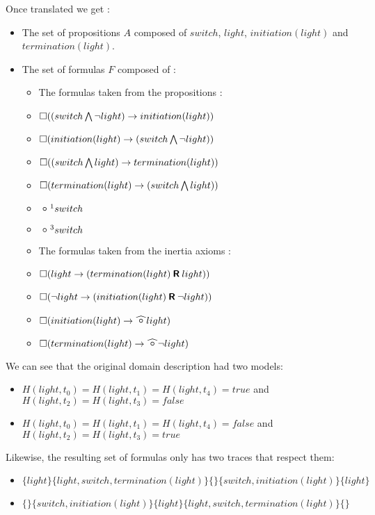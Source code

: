 Once translated we get :
\begin{itemize}
  \item The set of propositions $A$ composed of $switch$, $light$, $initiation(light)$ and $termination(light)$.
  \item The set of formulas $F$ composed of :
  \begin{itemize}
    \item The formulas taken from the propositions :
    \item $\square((switch\bigwedge \neg light)\rightarrow initiation(light))$
    \item $\square(initiation(light)\rightarrow (switch\bigwedge \neg light))$
    \item $\square((switch\bigwedge light)\rightarrow termination(light))$
    \item $\square(termination(light)\rightarrow (switch\bigwedge light))$
    \item $\next^{1}switch$
    \item $\next^{3}switch$
    \item The formulas taken from the inertia axioms :
    \item $\square(light\rightarrow (termination(light) \mathbin{\bm{\mathsf{R}}} light))$
    \item $\square(\neg light\rightarrow (initiation(light) \mathbin{\bm{\mathsf{R}}} \neg light))$
    \item $\alwaysF(initiation(light)\rightarrow\wnext light)$
    \item $\alwaysF(termination(light)\rightarrow\wnext \neg light)$
  \end{itemize}
\end{itemize}

We can see that the original domain description had two models:
\begin{itemize}
  \item $H(light,t_0)=H(light,t_1)=H(light,t_4)=true$ and $H(light,t_2)=H(light,t_3)=false$
  \item $H(light,t_0)=H(light,t_1)=H(light,t_4)=false$ and $H(light,t_2)=H(light,t_3)=true$
\end{itemize}

Likewise, the resulting set of formulas only has two traces that respect them:
\begin{itemize}
  \item $\{light\}\{light,switch,termination(light)\}\{\}\{switch,initiation(light)\}\{light\}$
  \item $\{\}\{switch,initiation(light)\}\{light\}\{light,switch,termination(light)\}\{\}$
\end{itemize}
